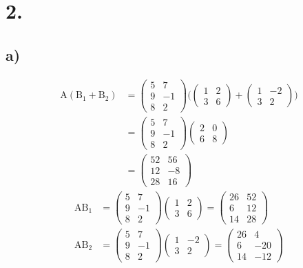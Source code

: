 \documentclass[a4paper]{scrartcl}
\begin{document}
	
\section{2.}
	\subsection{a)}
		\begin{align}
			\text{A}(\text{B}_1+\text{B}_2)&=\begin{pmatrix}
				5&7 \\ 9&-1 \\ 8&2
			\end{pmatrix}\Bigg(\begin{pmatrix}
				1&2 \\ 3&6
			\end{pmatrix}+\begin{pmatrix}
				1&-2 \\ 3&2
			\end{pmatrix}\Bigg) \\
			&=\begin{pmatrix}
				5&7 \\ 9&-1 \\ 8&2
			\end{pmatrix}\begin{pmatrix}
				2&0 \\ 6&8
			\end{pmatrix}\\
			&= \begin{pmatrix}
				52&56 \\ 12&-8 \\ 28&16
			\end{pmatrix}
		\end{align}
		\begin{align}
			\text{AB}_1 &= \begin{pmatrix}
				5&7 \\ 9&-1 \\ 8&2
			\end{pmatrix}\begin{pmatrix}
				1&2 \\ 3&6
			\end{pmatrix} 
			=\begin{pmatrix}
				26&52 \\ 6&12 \\ 14&28
			\end{pmatrix} \\
			\text{AB}_2 &= \begin{pmatrix}
				5&7 \\ 9&-1 \\ 8&2
			\end{pmatrix} 
			\begin{pmatrix}
				1&-2 \\ 3&2
			\end{pmatrix}
			=\begin{pmatrix}
				26&4 \\ 6&-20 \\ 14&-12
			\end{pmatrix} \\
		\end{align}
\end{document}

